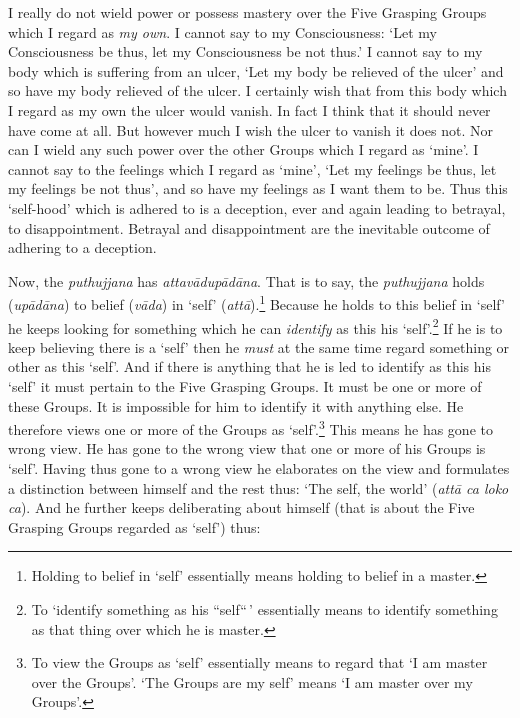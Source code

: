 I really do not wield power or possess mastery over the Five Grasping Groups which I regard as \emph{my own}. I cannot say to my Consciousness: `Let my Consciousness be thus, let my Consciousness be not thus.' I cannot say to my body which is suffering from an ulcer, `Let my body be relieved of the ulcer' and so have my body relieved of the ulcer. I certainly wish that from this body which I regard as my own the ulcer would vanish. In fact I think that it should never have come at all. But however much I wish the ulcer to vanish it does not. Nor can I wield any such power over the other Groups which I regard as `mine'. I cannot say to the feelings which I regard as `mine', `Let my feelings be thus, let my feelings be not thus', and so have my feelings as I want them to be. Thus this `self-hood' which is adhered to is a deception, ever and again leading to betrayal, to disappointment. Betrayal and disappointment are the inevitable outcome of adhering to a deception.

Now, the \textit{puthujjana} has \textit{attavādupādāna}. That is to say, the \textit{puthujjana} holds (\textit{upādāna}) to belief (\textit{vāda}) in `self' (\textit{attā}).\footnote{Holding to belief in `self' essentially means holding to belief in a master.} Because he holds to this belief in `self' he keeps looking for something which he can \emph{identify} as this his `self'.\footnote{To `identify something as his ``self``\,' essentially means to identify something as that thing over which he is master.} If he is to keep believing there is a `self' then he \emph{must} at the same time regard something or other as this `self'. And if there is anything that he is led to identify as this his `self' it must pertain to the Five Grasping Groups. It must be one or more of these Groups. It is impossible for him to identify it with anything else. He therefore views one or more of the Groups as `self'.\footnote{To view the Groups as `self' essentially means to regard that `I am master over the Groups'. `The Groups are my self' means `I am master over my Groups'.} This means he has gone to wrong view. He has gone to the wrong view that one or more of his Groups is `self'. Having thus gone to a wrong view he elaborates on the view and formulates a distinction between himself and the rest thus: `The self, the world' (\textit{attā ca loko ca}). And he further keeps deliberating about himself (that is about the Five Grasping Groups regarded as `self') thus:

